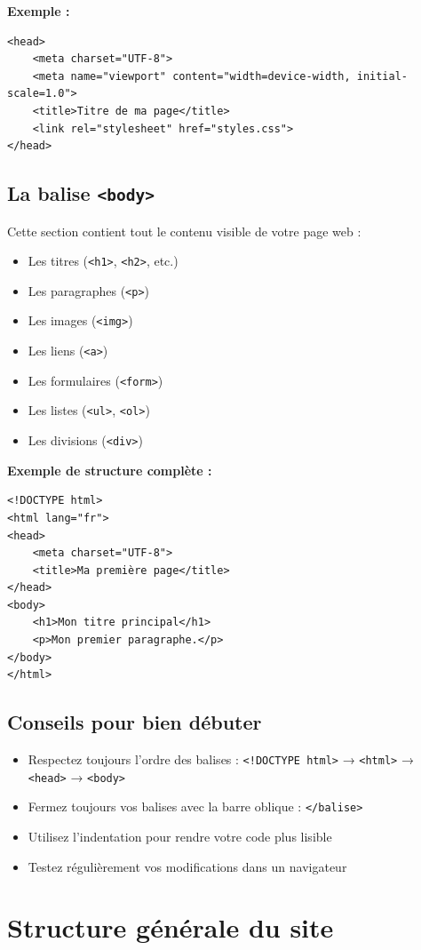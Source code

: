 \documentclass[12pt,a4paper]{article}
\begin{document}
\textbf{Exemple :}
\begin{lstlisting}
<head>
    <meta charset="UTF-8">
    <meta name="viewport" content="width=device-width, initial-scale=1.0">
    <title>Titre de ma page</title>
    <link rel="stylesheet" href="styles.css">
</head>
\end{lstlisting}

\subsection{La balise \texttt{<body>}}
Cette section contient tout le contenu visible de votre page web :
\begin{itemize}
\item Les titres (\texttt{<h1>}, \texttt{<h2>}, etc.)
\item Les paragraphes (\texttt{<p>})
\item Les images (\texttt{<img>})
\item Les liens (\texttt{<a>})
\item Les formulaires (\texttt{<form>})
\item Les listes (\texttt{<ul>}, \texttt{<ol>})
\item Les divisions (\texttt{<div>})
\end{itemize}

\textbf{Exemple de structure complète :}
\begin{lstlisting}
<!DOCTYPE html>
<html lang="fr">
<head>
    <meta charset="UTF-8">
    <title>Ma première page</title>
</head>
<body>
    <h1>Mon titre principal</h1>
    <p>Mon premier paragraphe.</p>
</body>
</html>
\end{lstlisting}

\subsection{Conseils pour bien débuter}
\begin{itemize}
\item Respectez toujours l'ordre des balises : \texttt{<!DOCTYPE html>} → \texttt{<html>} → \texttt{<head>} → \texttt{<body>}
\item Fermez toujours vos balises avec la barre oblique : \texttt{</balise>}
\item Utilisez l'indentation pour rendre votre code plus lisible
\item Testez régulièrement vos modifications dans un navigateur
\end{itemize}

\section{Structure générale du site}
\end{document}
